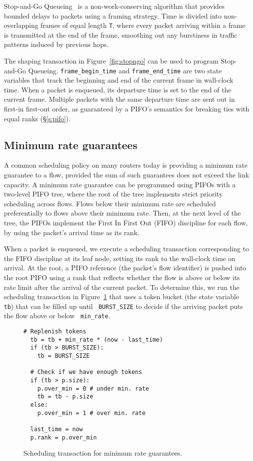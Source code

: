 Stop-and-Go Queueing~\cite{stopngo} is a non-work-conserving algorithm that
provides bounded delays to packets using a framing strategy. Time is divided
into non-overlapping frames of equal length \texttt{T}, where every packet
arriving within a frame is transmitted at the end of the frame, smoothing out
any burstiness in traffic patterns induced by previous hops.

The shaping transaction in Figure~\ref{fig:stopngo} can be used to program
Stop-and-Go Queueing. {\tt frame\_begin\_time} and {\tt frame\_end\_time} are
two state variables that track the beginning and end of the current frame in
wall-clock time.  When a packet is enqueued, its departure time is set to the
end of the current frame.  Multiple packets with the same departure time are
sent out in first-in first-out order, as guaranteed by a PIFO's semantics for
breaking ties with equal ranks (\S\ref{s:pifo}).

\subsection{Minimum rate guarantees}
\label{ss:min_rate}

A common scheduling policy on many routers today is providing a minimum rate
guarantee to a flow, provided the sum of such guarantees does not exceed the
link capacity. A minimum rate guarantee can be programmed using PIFOs with a
two-level PIFO tree, where the root of the tree implements strict priority
scheduling across flows. Flows below their minimum rate are scheduled
preferentially to flows above their minimum rate. Then, at the next level of
the tree, the PIFOs implement the First In First Out (FIFO) discipline for each
flow, by using the packet's arrival time as its rank.

When a packet is enqueued, we execute a scheduling transaction corresponding to
the FIFO discipline at its leaf node, setting its rank to the wall-clock time
on arrival. At the root, a PIFO reference (the packet's flow identifier) is
pushed into the root PIFO using a rank that reflects whether the flow is above
or below its rate limit after the arrival of the current packet. To determine
this, we run the scheduling transaction in Figure~\ref{fig:min_rate} that uses
a token bucket (the state variable {\tt tb}) that can be filled up until {\tt
BURST\_SIZE} to decide if the arriving packet puts the flow above or below {\tt
min\_rate}.

\begin{figure}
  \begin{lstlisting}[style=customc]
  # Replenish tokens
  tb = tb + min_rate * (now - last_time)
  if (tb > BURST_SIZE):
    tb = BURST_SIZE

  # Check if we have enough tokens
  if (tb > p.size):
    p.over_min = 0 # under min. rate
    tb = tb - p.size
  else:
    p.over_min = 1 # over min. rate

  last_time = now
  p.rank = p.over_min
  \end{lstlisting}
\caption{Scheduling transaction for minimum rate guarantees.}
\label{fig:min_rate}
\end{figure}

